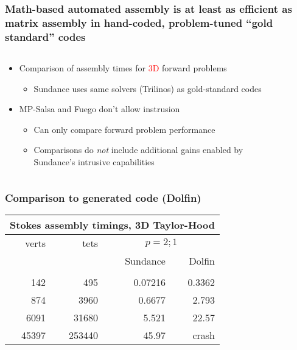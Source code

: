 \documentclass[10pt,xcolor=dvipsnames]{beamer}
\begin{document}
\frame
{
  \frametitle{Math-based automated assembly is at least as efficient
as matrix assembly in hand-coded, problem-tuned ``gold standard'' codes}

\begin{columns}
\begin{column}{6.5cm}
  \begin{block}{}
  \begin{itemize}
  \item Comparison of assembly times for \textcolor{red}{3D} forward
  problems
  \begin{itemize}
  \item Sundance uses same solvers (Trilinos) as gold-standard codes
  \end{itemize}
  \item MP-Salsa and Fuego don't allow instrusion
  \begin{itemize}
  \item Can only compare forward problem performance
  \item Comparisons do {\it not } include additional
  gains enabled by Sundance's intrusive capabilities
  \end{itemize}
  \end{itemize}
  \end{block}
\end{column}
\begin{column}{3.5cm}
\begin{figure}
\end{figure}
\begin{figure}
\end{figure}
\end{column}
\end{columns}
}

\frame
{
  \frametitle{Comparison to generated code (Dolfin)}

  \begin{block}{}

\begin{center}
\begin{tabular}{|r|r||r|r|}
\hline
\multicolumn{4}{|c|}{Stokes assembly timings, 3D Taylor-Hood}\\
\hline
verts & tets    &  \multicolumn{2}{|c|}{$p=2;1$} \\
\hline
      &  &  Sundance & Dolfin\\
\hline
  &      &            &        \\
  142 & 495 & 0.07216 & 0.3362 \\
 874 & 3960 & 0.6677 & 2.793 \\
 6091 & 31680 & 5.521 & 22.57 \\
 45397 & 253440 & 45.97 & crash\\
\hline
\end{tabular}
\end{center}
  \end{block}

}
\end{document}
